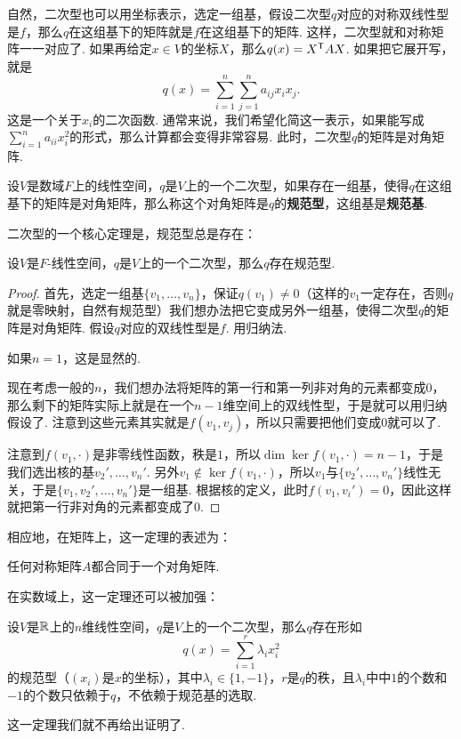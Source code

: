 自然，二次型也可以用坐标表示，选定一组基，假设二次型$q$对应的对称双线性型是$f$，那么$q$在这组基下的矩阵就是$f$在这组基下的矩阵. 这样，二次型就和对称矩阵一一对应了. 如果再给定$x\in V$的坐标$X$，那么$q(x)=X^{\mathsf{T}} AX$. 如果把它展开写，就是
\[
    q(x)=\sum_{i=1}^n\sum_{j=1}^n a_{ij}x_ix_j.
\]
这是一个关于$x_i$的二次函数. 通常来说，我们希望化简这一表示，如果能写成$\sum_{i=1}^n a_{ii}x_i^2$的形式，那么计算都会变得非常容易. 此时，二次型$q$的矩阵是对角矩阵. 

\begin{definition}[规范型]\label{def:canonical-form}
    设$V$是数域$F$上的线性空间，$q$是$V$上的一个二次型，如果存在一组基，使得$q$在这组基下的矩阵是对角矩阵，那么称这个对角矩阵是$q$的\textbf{规范型}，这组基是\textbf{规范基}. 
\end{definition}

二次型的一个核心定理是，规范型总是存在：
\begin{theorem}\label{thm:quadratic-form-diagonalization}
    设$V$是$F$-线性空间，$q$是$V$上的一个二次型，那么$q$存在规范型. 
\end{theorem}
\begin{proof}
首先，选定一组基$\{v_1,\dots,v_n\}$，保证$q(v_1)\neq 0$（这样的$v_1$一定存在，否则$q$就是零映射，自然有规范型）我们想办法把它变成另外一组基，使得二次型$q$的矩阵是对角矩阵. 假设$q$对应的双线性型是$f$. 用归纳法. 

如果$n=1$，这是显然的. 

现在考虑一般的$n$，我们想办法将矩阵的第一行和第一列非对角的元素都变成$0$，那么剩下的矩阵实际上就是在一个$n-1$维空间上的双线性型，于是就可以用归纳假设了. 注意到这些元素其实就是$f(v_1,v_j)$，所以只需要把他们变成$0$就可以了. 

注意到$f(v_1,\cdot)$是非零线性函数，秩是$1$，所以$\dim\ker f(v_1,\cdot)=n-1$，于是我们选出核的基$v_2',\dots,v_n'$. 另外$v_1\notin\ker f(v_1,\cdot)$，所以$v_1$与$\{v_2',\dots,v_n'\}$线性无关，于是$\{v_1,v_2',\dots,v_n'\}$是一组基. 根据核的定义，此时$f(v_1,v_i')=0$，因此这样就把第一行非对角的元素都变成了$0$. 
\end{proof}

相应地，在矩阵上，这一定理的表述为：
\begin{corollary}\label{cor:quadratic-form-diagonalization}
任何对称矩阵$A$都合同于一个对角矩阵. 
\end{corollary}


在实数域上，这一定理还可以被加强：

\begin{theorem}[惯性定理]\label{thm:inertia-theorem}
    设$V$是$\mathbb{R}$上的$n$维线性空间，$q$是$V$上的一个二次型，那么$q$存在形如
    \[
        q(x)=\sum_{i=1}^r \lambda_i x_i^2
    \]
    的规范型（$(x_i)$是$x$的坐标），其中$\lambda_i\in\{1,-1\}$，$r$是$q$的秩，且$\lambda_i$中中$1$的个数和$-1$的个数只依赖于$q$，不依赖于规范基的选取. 
\end{theorem}
这一定理我们就不再给出证明了. 

